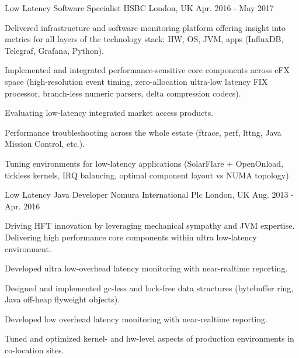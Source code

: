 \begin{cventries}
  \cventry
    {Low Latency Software Specialist} %
    {HSBC} %
    {London, UK} %
    {Apr. 2016 - May 2017} %
    {
      \begin{cvitems} %
        \item {Delivered infrastructure and software monitoring platform offering insight into metrics for all layers of the technology stack: HW, OS, JVM, apps (InfluxDB, Telegraf, Grafana, Python).}
        \item {Implemented and integrated performance-sensitive core components across eFX space (high-resolution event timing, zero-allocation ultra-low latency FIX processor, branch-less numeric parsers, delta compression codecs).}
        \item {Evaluating low-latency integrated market access products.}
        \item {Performance troubleshooting across the whole estate (ftrace, perf, lttng, Java Mission Control, etc.).}
        \item {Tuning environments for low-latency applications (SolarFlare + OpenOnload, tickless kernels, IRQ balancing, optimal component layout vs NUMA topology).}
      \end{cvitems}
    }

  \cventry
    {Low Latency Java Developer} %
    {Nomura International Plc} %
    {London, UK} %
    {Aug. 2013 - Apr. 2016} %
    {
      \begin{cvitems} %
        \item {Driving HFT innovation by leveraging mechanical sympathy and JVM expertise. Delivering high performance core components within ultra low-latency environment.}
        \item {Developed ultra low-overhead latency monitoring with near-realtime reporting.}
        \item {Designed and implemented gc-less and lock-free data structures (bytebuffer ring, Java off-heap flyweight objects).}
        \item {Developed low overhead latency monitoring with near-realtime reporting.}
        \item {Tuned and optimized kernel- and hw-level aspects of production environments in co-location sites.}
      \end{cvitems}
    }


\end{cventries}
